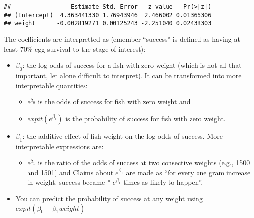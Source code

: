 \documentclass[]{book}
\newenvironment{Shaded}{\begin{snugshade}}{\end{snugshade}}
\newcommand{\KeywordTok}[1]{\textcolor[rgb]{0.13,0.29,0.53}{\textbf{#1}}}
\newcommand{\DataTypeTok}[1]{\textcolor[rgb]{0.13,0.29,0.53}{#1}}
\newcommand{\StringTok}[1]{\textcolor[rgb]{0.31,0.60,0.02}{#1}}
\newcommand{\OperatorTok}[1]{\textcolor[rgb]{0.81,0.36,0.00}{\textbf{#1}}}
\newcommand{\NormalTok}[1]{#1}
\providecommand{\tightlist}{%
  \setlength{\itemsep}{0pt}\setlength{\parskip}{0pt}}
\theoremstyle{definition}
\theoremstyle{definition}
\theoremstyle{definition}
\theoremstyle{remark}
\begin{document}
\begin{Shaded}
\end{Shaded}

\begin{verbatim}
##                 Estimate Std. Error   z value   Pr(>|z|)
## (Intercept)  4.363441330 1.76943946  2.466002 0.01366306
## weight      -0.002819271 0.00125243 -2.251040 0.02438303
\end{verbatim}

The coefficients are interpretted as (emember ``success'' is defined as
having at least 70\% egg survival to the stage of interest):

\begin{itemize}
\tightlist
\item
  \(\beta_0\): the log odds of success for a fish with zero weight
  (which is not all that important, let alone difficult to interpret).
  It can be transformed into more interpretable quantities:

  \begin{itemize}
  \tightlist
  \item
    \(e^{\beta_0}\) is the odds of success for fish with zero weight and
  \item
    \(expit(e^{\beta_0})\) is the probability of success for fish with
    zero weight.
  \end{itemize}
\item
  \(\beta_1\): the additive effect of fish weight on the log odds of
  success. More interpretable expressions are:

  \begin{itemize}
  \tightlist
  \item
    \(e^{\beta_1}\) is the ratio of the odds of success at two
    consective weights (e.g., 1500 and 1501) and Claims about
    \(e^{\beta_1}\) are made as ``for every one gram increase in weight,
    success became * \(e^{\beta_1}\) times as likely to happen''.
  \end{itemize}
\item
  You can predict the probability of success at any weight using
  \(expit(\beta_0 + \beta_1 weight)\)
\end{itemize}
\end{document}
